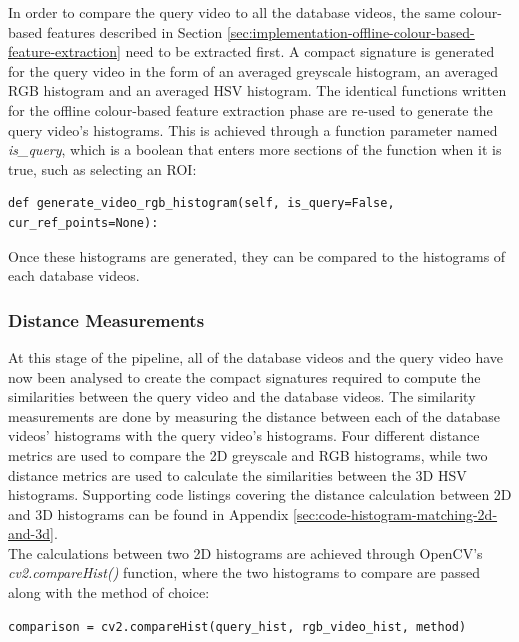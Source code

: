 In order to compare the query video to all the database videos, the same colour-based features described in Section \ref{sec:implementation-offline-colour-based-feature-extraction} need to be extracted first. A compact signature is generated for the query video in the form of an averaged greyscale histogram, an averaged RGB histogram and an averaged HSV histogram. The identical functions written for the offline colour-based feature extraction phase are re-used to generate the query video's histograms. This is achieved through a function parameter named \textit{is\_query}, which is a boolean that enters more sections of the function when it is true, such as selecting an ROI:

\begin{lstlisting}[numbers=none]
def generate_video_rgb_histogram(self, is_query=False, cur_ref_points=None):
\end{lstlisting}

Once these histograms are generated, they can be compared to the histograms of each database videos.

\subsubsection{Distance Measurements}
\label{sec:implementation-distance-measurements}

At this stage of the pipeline, all of the database videos and the query video have now been analysed to create the compact signatures required to compute the similarities between the query video and the database videos. The similarity measurements are done by measuring the distance between each of the database videos' histograms with the query video's histograms. Four different distance metrics are used to compare the 2D greyscale and RGB histograms, while two distance metrics are used to calculate the similarities between the 3D HSV histograms. Supporting code listings covering the distance calculation between 2D and 3D histograms can be found in Appendix \ref{sec:code-histogram-matching-2d-and-3d}.\\

The calculations between two 2D histograms are achieved through OpenCV's \textit{cv2.compareHist()} function, where the two histograms to compare are passed along with the method of choice:

\begin{lstlisting}[numbers=none]
comparison = cv2.compareHist(query_hist, rgb_video_hist, method)
\end{lstlisting}

